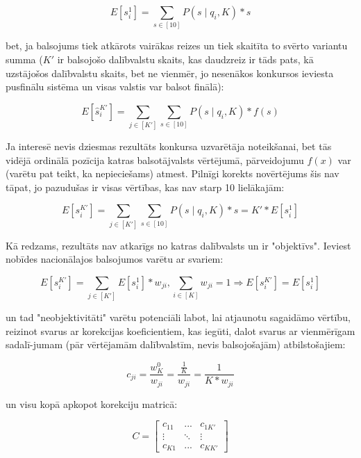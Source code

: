\documentclass[12pt, a4paper]{article}
\begin{document}
\begin{equation}
    E[s_i^1] = \sum_{s\in[10]}P(s\mid q_i, K)*s
\end{equation}

bet, ja balsojums tiek atkārots vairākas reizes un tiek skaitīta to svērto variantu summa ($K'$ ir balsojošo dalībvalstu skaits, kas daudzreiz ir tāds pats, kā uzstājošos dalībvalstu skaits, bet ne vienmēr, jo nesenākos konkursos ieviesta pusfinālu sistēma un visas valstis var balsot finālā):

\begin{equation}
    E[\hat s_i^{K'}] = \sum_{j\in [K']}\sum_{s\in[10]}P(s\mid q_i, K)*f(s)
\end{equation}

Ja interesē nevis dziesmas rezultāts konkursa uzvarētāja noteikšanai, bet tās vidējā ordinālā pozīcija katras balsotājvalsts vērtējumā, pārveidojumu $f(x)$ var (varētu pat teikt, ka nepieciešams) atmest. Pilnīgi korekts novērtējums šis nav tāpat, jo pazudušas ir visas vērtības, kas nav starp 10 lielākajām:

\begin{equation}
    E[s_i^{K'}] = \sum_{j\in [K']}\sum_{s\in[10]}P(s\mid q_i, K)*s = K'*E[s_i^1]
\end{equation}

Kā redzams, rezultāts nav atkarīgs no katras dalībvalsts un ir "objektīvs". Ieviest nobīdes nacionālajos balsojumos varētu ar svariem:

\begin{equation}
    E[s_i^{K'}] = \sum_{j\in [K']}E[s_i^{1}]*w_{ji}, \sum_{i\in[K]} w_{ji} = 1 \Rightarrow  E[s_i^{K'}] = E[s_i^{1}]
\end{equation}

un tad "neobjektivitāti" varētu potenciāli labot, lai atjaunotu sagaidāmo vērtību, reizinot svarus ar korekcijas koeficientiem, kas iegūti, dalot svarus ar vienmērīgam sadalī-jumam (pār vērtējamām dalībvalstīm, nevis balsojošajām) atbilstošajiem:

\begin{equation}
    c_{ji}=\frac{w_{K}^0}{w_{ji}}=\frac{\frac{1}{K}}{w_{ji}}=\frac{1}{K*w_{ji}}
\end{equation}

un visu kopā apkopot korekciju matricā:

\begin{equation}
    C=
    \begin{bmatrix}
        c_{11} &  ... & c_{1K'} \\
        \vdots & \ddots & \vdots \\
        c_{K1} &  ... & c_{KK'} 
    \end{bmatrix}
\end{equation}
\end{document}
